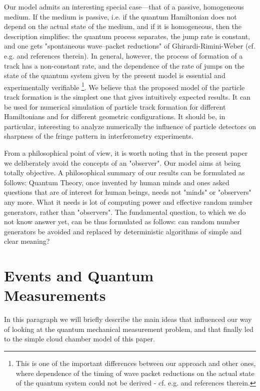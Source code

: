 \documentclass[12pt]{article}
\begin{document}
Our model admits an interesting special case---that of a passive,
homogeneous medium. If the medium is passive, i.e. if the quantum
Hamiltonian does not depend on the actual state of the medium, and if it is
homogeneous, then the description simplifies: the quantum process
separates, the jump rate is constant, and one gets "spontaneous
wave--packet reductions" of Ghirardi-Rimini-Weber (cf. e.g. \cite{ghi1}
and references therein). In general, however, the process of formation of a
track has a non-constant rate, and the dependence of the rate of jumps on
the state of the quantum system given by the present model is essential and
experimentally verifiable \footnote{This is one of the important
differences between our approach and other ones, where dependence of the
timing of wave packet reductions on the actual state of the quantum system
could not be derived - cf. e.g.\cite{cav1} and references therein.}. We
believe that the proposed model of the particle track formation is the
simplest one that gives intuitively expected results. It can be used for
numerical simulation of particle track formation for different Hamiltonians
and for different geometric configurations. It should be, in particular,
interesting to analyze numerically the influence of particle detectors on
sharpness of the fringe pattern in interferometry experiments.

From a philosophical point of view, it is worth noting that in the present
paper we deliberately avoid the concepts of an "observer". Our model aims
at being totally objective. A philosophical summary of our results can be
formulated as follows: Quantum Theory, once invented by human minds and
ones asked questions that are of interest for human beings, needs not
"minds" or "observers" any more. What it needs is lot of computing power
and effective random number generators, rather than "observers". The
fundamental question, to which we do not know answer yet, can be thus
formulated as follows: can random number generators be avoided and replaced
by deterministic algorithms of simple and clear meaning?

\section{Events and Quantum Measurements}
In this paragraph we will briefly describe the main ideas that influenced
our way of looking at the quantum mechanical measurement problem, and that
finally led to the simple cloud chamber model of this paper.
\end{document}
